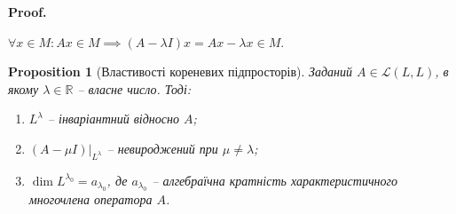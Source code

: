 \documentclass[a4paper, 10pt]{article}
\makeatletter
\theoremstyle{theoremdd}
\newtheorem{proposition}[theorem]{Proposition}
\renewenvironment{proof}[1][Proof.\\]{\par
\pushQED{\hfill \qed}%
\normalfont \topsep6\p@\@plus6\p@\relax
\trivlist
\item\relax
{\bfseries
#1\@addpunct{.}}\hspace\labelsep\ignorespaces
}{%
\popQED\endtrivlist\@endpefalse
}
\makeatother
\begin{document}
\begin{proof}
$\forall x \in M: Ax \in M \implies (A-\lambda I)x = Ax - \lambda x \in M$.
\end{proof}

\begin{proposition}[Властивості кореневих підпросторів]
Заданий $A \in \mathcal{L}(L,L)$, в якому $\lambda \in \mathbb{R}$ -- власне число. Тоді:
\begin{enumerate}[nosep,wide=0pt,label={\arabic*)}]
\item $L^\lambda$ -- інваріантний відносно $A$;
\item $(A-\mu I)|_{L^\lambda}$ -- невироджений при $\mu \neq \lambda$;
\item $\dim L^{\lambda_0} = a_{\lambda_0}$, де $a_{\lambda_0}$ -- алгебраїчна кратність характеристичного многочлена оператора $A$.
\end{enumerate}
\end{proposition}
\end{document}
